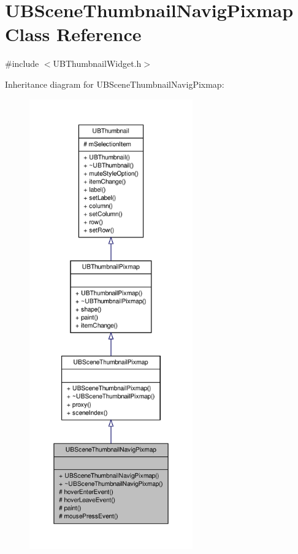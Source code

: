 \hypertarget{class_u_b_scene_thumbnail_navig_pixmap}{\section{U\-B\-Scene\-Thumbnail\-Navig\-Pixmap Class Reference}
\label{da/d05/class_u_b_scene_thumbnail_navig_pixmap}
}


{\ttfamily \#include $<$U\-B\-Thumbnail\-Widget.\-h$>$}



Inheritance diagram for U\-B\-Scene\-Thumbnail\-Navig\-Pixmap\-:
\nopagebreak
\begin{figure}[H]
\begin{center}
\leavevmode
\includegraphics[height=550pt]{dc/d2f/class_u_b_scene_thumbnail_navig_pixmap__inherit__graph}
\end{center}
\end{figure}


